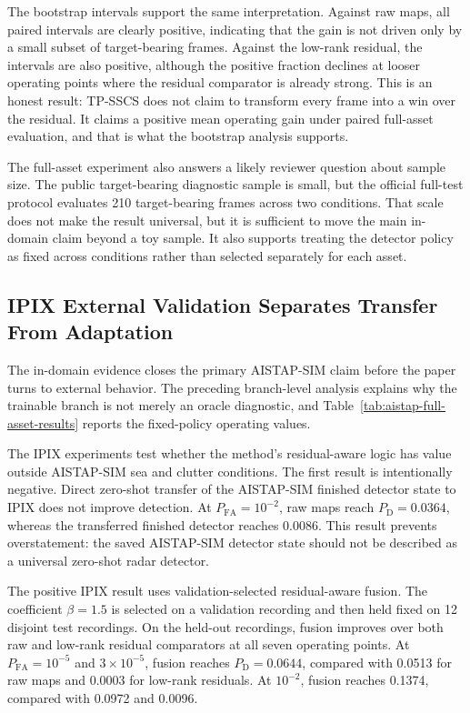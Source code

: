 \documentclass[journal]{IEEEtran}
\begin{document}
The bootstrap intervals support the same interpretation. Against raw maps, all paired intervals are clearly positive, indicating that the gain is not driven only by a small subset of target-bearing frames. Against the low-rank residual, the intervals are also positive, although the positive fraction declines at looser operating points where the residual comparator is already strong. This is an honest result: TP-SSCS does not claim to transform every frame into a win over the residual. It claims a positive mean operating gain under paired full-asset evaluation, and that is what the bootstrap analysis supports.

The full-asset experiment also answers a likely reviewer question about sample size. The public target-bearing diagnostic sample is small, but the official full-test protocol evaluates 210 target-bearing frames across two conditions. That scale does not make the result universal, but it is sufficient to move the main in-domain claim beyond a toy sample. It also supports treating the detector policy as fixed across conditions rather than selected separately for each asset.

\subsection{IPIX External Validation Separates Transfer From Adaptation}

The in-domain evidence closes the primary AISTAP-SIM claim before the paper turns to external behavior. The preceding branch-level analysis explains why the trainable branch is not merely an oracle diagnostic, and Table~\ref{tab:aistap-full-asset-results} reports the fixed-policy operating values.

The IPIX experiments test whether the method's residual-aware logic has value outside AISTAP-SIM sea and clutter conditions. The first result is intentionally negative. Direct zero-shot transfer of the AISTAP-SIM finished detector state to IPIX does not improve detection. At $P_{\mathrm{FA}}=10^{-2}$, raw maps reach $P_{\mathrm{D}}=0.0364$, whereas the transferred finished detector reaches 0.0086. This result prevents overstatement: the saved AISTAP-SIM detector state should not be described as a universal zero-shot radar detector.

The positive IPIX result uses validation-selected residual-aware fusion. The coefficient $\beta=1.5$ is selected on a validation recording and then held fixed on 12 disjoint test recordings. On the held-out recordings, fusion improves over both raw and low-rank residual comparators at all seven operating points. At $P_{\mathrm{FA}}=10^{-5}$ and $3 \times 10^{-5}$, fusion reaches $P_{\mathrm{D}}=0.0644$, compared with 0.0513 for raw maps and 0.0003 for low-rank residuals. At $10^{-2}$, fusion reaches 0.1374, compared with 0.0972 and 0.0096.
\end{document}
